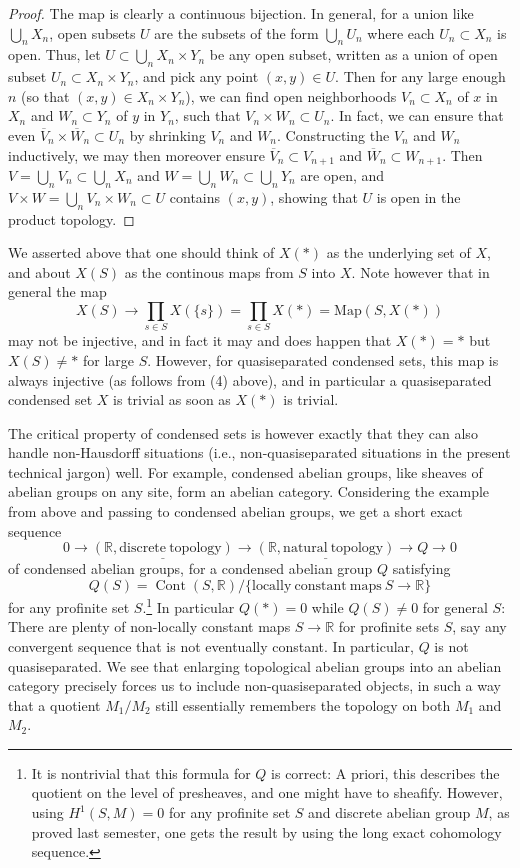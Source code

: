 \documentclass[11pt]{amsbook}
\DeclareMathOperator{\Cont}{Cont}
\numberwithin{equation}{section}
\numberwithin{theorem}{section}
\theoremstyle{definition}
\begin{document}
\begin{proof} The map is clearly a continuous bijection. In general, for a union like $\bigcup_n X_n$, open subsets $U$ are the subsets of the form $\bigcup_n U_n$ where each $U_n\subset X_n$ is open. Thus, let $U\subset \bigcup_n X_n\times Y_n$ be any open subset, written as a union of open subset $U_n\subset X_n\times Y_n$, and pick any point $(x,y)\in U$. Then for any large enough $n$ (so that $(x,y)\in X_n\times Y_n$), we can find open neighborhoods $V_n\subset X_n$ of $x$ in $X_n$ and $W_n\subset Y_n$ of $y$ in $Y_n$, such that $V_n\times W_n\subset U_n$. In fact, we can ensure that even $\overline{V}_n\times \overline{W}_n\subset U_n$ by shrinking $V_n$ and $W_n$. Constructing the $V_n$ and $W_n$ inductively, we may then moreover ensure $\overline{V}_n\subset V_{n+1}$ and $\overline{W}_n\subset W_{n+1}$. Then $V=\bigcup_n V_n\subset \bigcup_n X_n$ and $W=\bigcup_n W_n\subset \bigcup_n Y_n$ are open, and $V\times W = \bigcup_n V_n\times W_n\subset U$ contains $(x,y)$, showing that $U$ is open in the product topology.
\end{proof}

We asserted above that one should think of $X(\ast)$ as the underlying set of $X$, and about $X(S)$ as the continous maps from $S$ into $X$. Note however that in general the map
\[
X(S)\to \prod_{s\in S} X(\{s\}) = \prod_{s\in S} X(\ast) = \mathrm{Map}(S,X(\ast))
\]
may not be injective, and in fact it may and does happen that $X(\ast)=\ast$ but $X(S)\neq \ast$ for large $S$. However, for quasiseparated condensed sets, this map is always injective (as follows from (4) above), and in particular a quasiseparated condensed set $X$ is trivial as soon as $X(\ast)$ is trivial.

The critical property of condensed sets is however exactly that they can also handle non-Hausdorff situations (i.e., non-quasiseparated situations in the present technical jargon) well. For example, condensed abelian groups, like sheaves of abelian groups on any site, form an abelian category. Considering the example from above and passing to condensed abelian groups, we get a short exact sequence
\[
0\to \underline{(\mathbb R, \mathrm{discrete\ topology})}\to \underline{(\mathbb R,\mathrm{natural\ topology})}\to Q\to 0
\]
of condensed abelian groups, for a condensed abelian group $Q$ satisfying
\[
Q(S) = \Cont(S,\mathbb R)/\{\mathrm{locally\ constant\ maps\ } S\to \mathbb R\}
\]
for any profinite set $S$.\footnote{It is nontrivial that this formula for $Q$ is correct: A priori, this describes the quotient on the level of presheaves, and one might have to sheafify. However, using $H^1(S,M)=0$ for any profinite set $S$ and discrete abelian group $M$, as proved last semester, one gets the result by using the long exact cohomology sequence.} In particular $Q(\ast)=0$ while $Q(S)\neq 0$ for general $S$: There are plenty of non-locally constant maps $S\to \mathbb R$ for profinite sets $S$, say any convergent sequence that is not eventually constant. In particular, $Q$ is not quasiseparated. We see that enlarging topological abelian groups into an abelian category precisely forces us to include non-quasiseparated objects, in such a way that a quotient $M_1/M_2$ still essentially remembers the topology on both $M_1$ and $M_2$.
\end{document}
